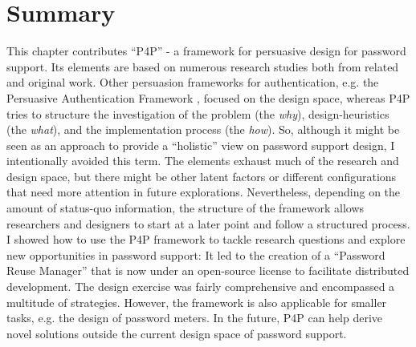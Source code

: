 \section{Summary}
This chapter contributes ``P4P'' - a framework for persuasive design for password support. Its elements are based on numerous research studies both from related and original work. Other persuasion frameworks for authentication, e.g. the Persuasive Authentication Framework \cite{Forget2007PersuasionEducationSecurity}, focused on the design space, whereas P4P tries to structure the investigation of the problem (the \textit{why}), design-heuristics (the \textit{what}), and the implementation process (the \textit{how}). So, although it might be seen as an approach to provide a ``holistic'' view on password support design, I intentionally avoided this term. The elements exhaust much of the research and design space, but there might be other latent factors or different configurations that need more attention in future explorations. Nevertheless, depending on the amount of status-quo information, the structure of the framework allows researchers and designers to start at a later point and follow a structured process. I showed how to use the P4P framework to tackle research questions and explore new opportunities in password support: It led to the creation of a ``Password Reuse Manager'' that is now under an open-source license to facilitate distributed development. The design exercise was fairly comprehensive and encompassed a multitude of strategies. However, the framework is also applicable for smaller tasks, e.g. the design of password meters. In the future, P4P can help derive novel solutions outside the current design space of password support. 

\vspace*{1.5cm}
\noindent
{}

